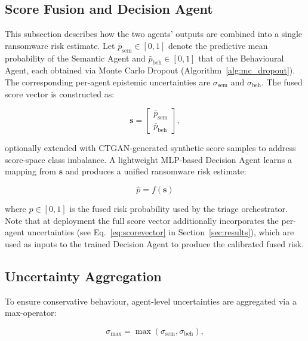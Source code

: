 \documentclass[lettersize,journal]{IEEEtran}
\begin{document}
\subsection{Score Fusion and Decision Agent}

This subsection describes how the two agents' outputs are combined into a single ransomware risk estimate.
Let $\bar{p}_{\text{sem}} \in [0,1]$ denote the predictive mean probability of the Semantic Agent
and $\bar{p}_{\text{beh}} \in [0,1]$ that of the Behavioural Agent, each obtained via Monte Carlo
Dropout (Algorithm~\ref{alg:mc_dropout}).
The corresponding per-agent epistemic uncertainties are $\sigma_{\text{sem}}$ and $\sigma_{\text{beh}}$.
The fused score vector is constructed as:

\begin{equation}
\mathbf{s} =
\begin{bmatrix}
\bar{p}_{\text{sem}} \\
\bar{p}_{\text{beh}}
\end{bmatrix},
\label{eq:scorevec_basic}
\end{equation}

optionally extended with CTGAN-generated synthetic score samples to address score-space class imbalance.
A lightweight MLP-based Decision Agent learns a mapping from $\mathbf{s}$ and produces a unified
ransomware risk estimate:

\begin{equation}
\hat{p} = f(\mathbf{s})
\label{eq:scorepool}
\end{equation}

where $\hat{p} \in [0,1]$ is the fused risk probability used by the triage orchestrator.
Note that at deployment the full score vector additionally incorporates the per-agent uncertainties
(see Eq.~\ref{eq:scorevector} in Section~\ref{sec:results}), which are used as inputs to the
trained Decision Agent to produce the calibrated fused risk.

\subsection{Uncertainty Aggregation}

To ensure conservative behaviour, agent-level uncertainties are aggregated via a max-operator:

\begin{equation}
\sigma_{\max} = \max(\sigma_{\text{sem}}, \sigma_{\text{beh}}),
\label{eq:sigmamax}
\end{equation}
\end{document}
